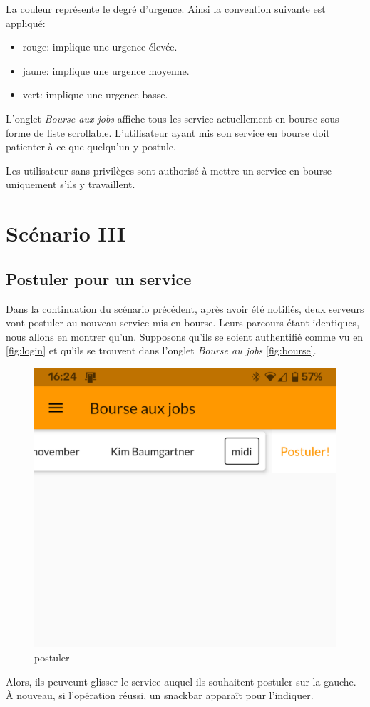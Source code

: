 La couleur représente le degré d'urgence. Ainsi la convention suivante est appliqué:
\begin{itemize}
    \item rouge: implique une urgence élevée.
    \item jaune: implique une urgence moyenne.
    \item vert: implique une urgence basse.
\end{itemize}

L'onglet \textit{Bourse aux jobs} affiche tous les service actuellement en bourse sous
forme de liste scrollable. L'utilisateur ayant mis son service en bourse
doit patienter à ce que quelqu'un y postule.

Les utilisateur sans privilèges sont authorisé à mettre un service en bourse uniquement s'ils y travaillent.

\section[Postuler pour un service - Scénario III]{Scénario III}
    \subsection*{Postuler pour un service}
    Dans la continuation du scénario précédent, après avoir été notifiés,
    deux serveurs vont postuler au nouveau service mis
    en bourse. Leurs parcours étant identiques, nous allons en montrer qu'un.
    Supposons qu'ils se soient authentifié comme vu en \ref{fig:login} et qu'ils se trouvent
    dans l'onglet \textit{Bourse au jobs} \ref{fig:bourse}.

    \begin{figure}[h]
        \centering
        \includegraphics[width=.3\linewidth]{screenshots/scenario_03/postuler.png}
        \caption{postuler}
        \label{fig:postuler}
    \end{figure}

    Alors, ils peuveunt glisser le service auquel ils souhaitent postuler sur
    la gauche. À nouveau, si l'opération réussi, un snackbar apparaît pour l'indiquer.

